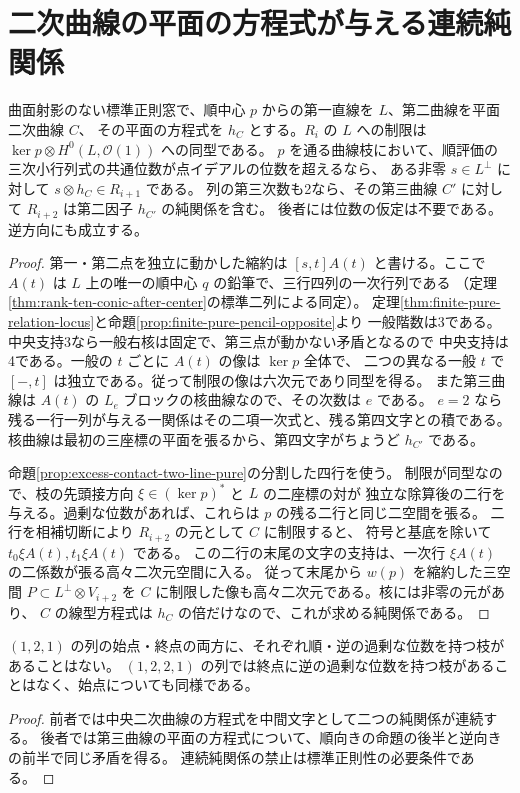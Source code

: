 \section{二次曲線の平面の方程式が与える連続純関係}
\label{sec:conic-corridor-excess}
\begin{proposition}\label{prop:conic-corridor-excess}
曲面射影のない標準正則窓で、順中心 $p$ からの第一直線を $L$、第二曲線を平面二次曲線 $C$、
その平面の方程式を $h_C$ とする。$R_i$ の $L$ への制限は
$\ker p\otimes H^0(L,\mathcal O(1))$ への同型である。
$p$ を通る曲線枝において、順評価の三次小行列式の共通位数が点イデアルの位数を超えるなら、
ある非零 $s\in L^\perp$ に対して $s\otimes h_C\in R_{i+1}$ である。
列の第三次数も2なら、その第三曲線 $C'$ に対して $R_{i+2}$ は第二因子 $h_{C'}$ の純関係を含む。
後者には位数の仮定は不要である。逆方向にも成立する。
\end{proposition}
\begin{proof}
第一・第二点を独立に動かした縮約は $[s,t]A(t)$ と書ける。ここで $A(t)$ は
$L$ 上の唯一の順中心 $q$ の鉛筆で、三行四列の一次行列である
（定理\ref{thm:rank-ten-conic-after-center}の標準二列による同定）。
定理\ref{thm:finite-pure-relation-locus}と命題\ref{prop:finite-pure-pencil-opposite}より
一般階数は3である。中央支持3なら一般右核は固定で、第三点が動かない矛盾となるので
中央支持は4である。一般の $t$ ごとに $A(t)$ の像は $\ker p$ 全体で、
二つの異なる一般 $t$ で $[-,t]$ は独立である。従って制限の像は六次元であり同型を得る。
また第三曲線は $A(t)$ の $L_e$ ブロックの核曲線なので、その次数は $e$ である。
$e=2$ なら残る一行一列が与える一関係はその二項一次式と、残る第四文字との積である。
核曲線は最初の三座標の平面を張るから、第四文字がちょうど $h_{C'}$ である。

命題\ref{prop:excess-contact-two-line-pure}の分割した四行を使う。
制限が同型なので、枝の先頭接方向 $\xi\in(\ker p)^*$ と $L$ の二座標の対が
独立な除算後の二行を与える。過剰な位数があれば、これらは $p$ の残る二行と同じ二空間を張る。
二行を相補切断により $R_{i+2}$ の元として $C$ に制限すると、
符号と基底を除いて $t_0\xi A(t),t_1\xi A(t)$ である。
この二行の末尾の文字の支持は、一次行 $\xi A(t)$ の二係数が張る高々二次元空間に入る。
従って末尾から $w(p)$ を縮約した三空間 $P\subset L^\perp\otimes V_{i+2}$ を
$C$ に制限した像も高々二次元である。核には非零の元があり、
$C$ の線型方程式は $h_C$ の倍だけなので、これが求める純関係である。
\end{proof}

\begin{corollary}\label{cor:conic-corridor-consecutive}
$(1,2,1)$ の列の始点・終点の両方に、それぞれ順・逆の過剰な位数を持つ枝があることはない。
$(1,2,2,1)$ の列では終点に逆の過剰な位数を持つ枝があることはなく、始点についても同様である。
\end{corollary}
\begin{proof}
前者では中央二次曲線の方程式を中間文字として二つの純関係が連続する。
後者では第三曲線の平面の方程式について、順向きの命題の後半と逆向きの前半で同じ矛盾を得る。
連続純関係の禁止は標準正則性の必要条件である。
\end{proof}
